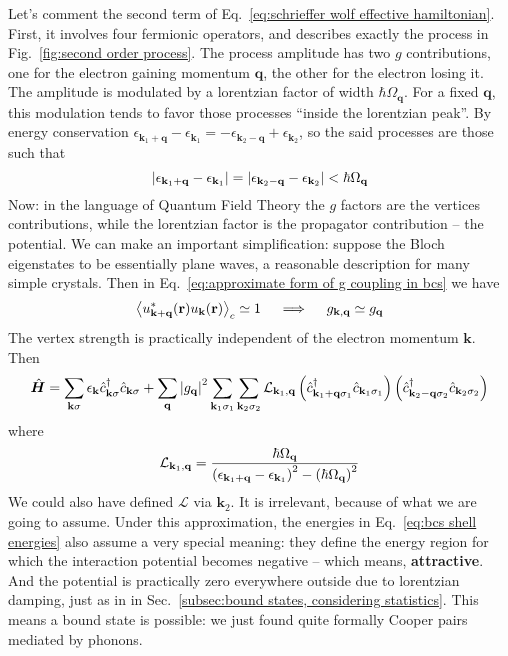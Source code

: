 Let's comment the second term of Eq.~\eqref{eq:schrieffer wolf effective hamiltonian}. First, it involves four fermionic operators, and describes exactly the process in Fig.~\ref{fig:second order process}. The process amplitude has two $g$ contributions, one for the electron gaining momentum $\mathbf{q}$, the other for the electron losing it. The amplitude is modulated by a lorentzian factor of width $\hbar\Omega_\mathbf{q}$. For a fixed $\mathbf{q}$, this modulation tends to favor those processes ``inside the lorentzian peak''. By energy conservation $\epsilon_{\mathbf{k}_1+\mathbf{q}} - \epsilon_{\mathbf{k}_1} = - \epsilon_{\mathbf{k}_2-\mathbf{q}} + \epsilon_{\mathbf{k}_2}$, so the said processes are those such that
\begin{equation}\label{eq:bcs shell energies}
	\abs{\epsilon_{\mathbf{k}_1+\mathbf{q}} - \epsilon_{\mathbf{k}_1}} = \abs{\epsilon_{\mathbf{k}_2-\mathbf{q}} - \epsilon_{\mathbf{k}_2}} < \hbar\Omega_\mathbf{q}
\end{equation}
Now: in the language of Quantum Field Theory the $g$ factors are the vertices contributions, while the lorentzian factor is the propagator contribution -- the potential. We can make an important simplification: suppose the Bloch eigenstates to be essentially plane waves, a reasonable description for many simple crystals. Then in Eq.~\eqref{eq:approximate form of g coupling in bcs} we have
\[
	\ev{u_{\mathbf{k}+\mathbf{q}}^*(\mathbf{r}) u_\mathbf{k}(\mathbf{r})}_c \simeq 1
	\quad\implies\quad
	g_{\mathbf{k},\mathbf{q}} \simeq g_\mathbf{q}
\]
The vertex strength is practically independent of the electron momentum $\mathbf{k}$. Then
\[
	\hat{\bm H} = \sum_{\mathbf{k}\sigma} \epsilon_{\mathbf{k}} \hat{c}_{\mathbf{k}\sigma}^\dagger \hat{c}_{\mathbf{k}\sigma} + \sum_\mathbf{q} \abs{g_\mathbf{q}}^2 \sum_{\mathbf{k}_1 \sigma_1} \sum_{\mathbf{k}_2 \sigma_2} \mathcal{L}_{\mathbf{k}_1,\mathbf{q}} \left({\hat{c}_{\mathbf{k}_1+\mathbf{q}\sigma_1}^\dagger \hat{c}_{\mathbf{k}_1\sigma_1}}\right) \left({\hat{c}_{\mathbf{k}_2-\mathbf{q}\sigma_2}^\dagger \hat{c}_{\mathbf{k}_2\sigma_2}}\right)
\]
where
\[
	\mathcal{L}_{\mathbf{k}_1,\mathbf{q}} = \frac{
		\hbar\Omega_\mathbf{q}
	}{
		\left({\epsilon_{\mathbf{k}_1+\mathbf{q}} - \epsilon_{\mathbf{k}_1}}\right)^2 - \left({\hbar\Omega_\mathbf{q}}\right)^2
	}
\]
We could also have defined $\mathcal{L}$ via $\mathbf{k}_2$. It is irrelevant, because of what we are going to assume. Under this approximation, the energies in Eq.~\eqref{eq:bcs shell energies} also assume a very special meaning: they define the energy region for which the interaction potential becomes negative -- which means, \textbf{attractive}. And the potential is practically zero everywhere outside due to lorentzian damping, just as in in Sec.~\ref{subsec:bound states, considering statistics}. This means a bound state is possible: we just found quite formally Cooper pairs mediated by phonons.

